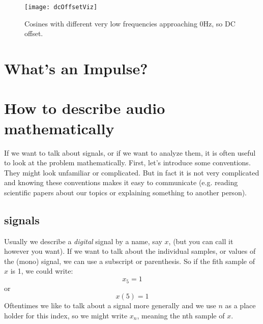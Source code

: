 \begin{figure}[h!]
	\centering
	\texttt{[image: dcOffsetViz]}
	\caption[shortCaption]
	{Cosines with different very low frequencies approaching 0Hz, so DC offset.}
	\label{fig:dcViz}
\end{figure}



\section{What's an Impulse?}



\section{How to describe audio mathematically}

If we want to talk about signals, or if we want to analyze them, it is often useful to look at the problem mathematically. First, let's introduce some conventions. They might look unfamiliar or complicated. But in fact it is not very complicated and knowing these conventions makes it easy to communicate (e.g. reading scientific papers about our topics or explaining something to another person).

\subsection{signals}

Usually we describe a \textit{digital} signal by a name, say $x$, (but you can call it however you want). If we want to talk about the individual samples, or values of the (mono) signal, we can use a subscript or parenthesis. So if the fith sample of $x$ is 1, we could write:
\begin{equation}
	x_5=1
\end{equation}
or 
\begin{equation}
	x(5)=1
\end{equation}
Oftentimes we like to talk about a signal more generally and we use $n$ as a place holder for this index, so we might write $x_n$, meaning the nth sample of $x$.

